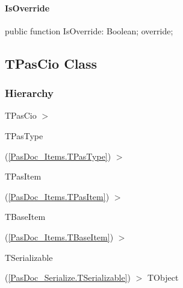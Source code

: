 \documentclass{report}
\newif\ifpdf
\begin{document}
\paragraph*{IsOverride}\hspace*{\fill}

\label{PasDoc_Items.TPasProperty-IsOverride}
\begin{list}{}{
\setlength{\itemindent}{0cm}
\setlength{\listparindent}{0cm}
\setlength{\leftmargin}{\evensidemargin}
\addtolength{\leftmargin}{\tmplength}
\settowidth{\labelsep}{X}
\addtolength{\leftmargin}{\labelsep}
\setlength{\labelwidth}{\tmplength}
}
\item[\textbf{Declaration}\hfill]
\ifpdf
\begin{flushleft}
\fi
\begin{ttfamily}
public function IsOverride: Boolean; override;\end{ttfamily}

\ifpdf
\end{flushleft}
\fi

\end{list}
\ifpdf
\subsection*{\large{\textbf{TPasCio Class}}\normalsize\hspace{1ex}\hrulefill}
\else
\subsection*{TPasCio Class}
\fi
\label{PasDoc_Items.TPasCio}
\subsubsection*{\large{\textbf{Hierarchy}}\normalsize\hspace{1ex}\hfill}
TPasCio {$>$} \begin{ttfamily}TPasType\end{ttfamily}(\ref{PasDoc_Items.TPasType}) {$>$} \begin{ttfamily}TPasItem\end{ttfamily}(\ref{PasDoc_Items.TPasItem}) {$>$} \begin{ttfamily}TBaseItem\end{ttfamily}(\ref{PasDoc_Items.TBaseItem}) {$>$} \begin{ttfamily}TSerializable\end{ttfamily}(\ref{PasDoc_Serialize.TSerializable}) {$>$} 
TObject
\end{document}
